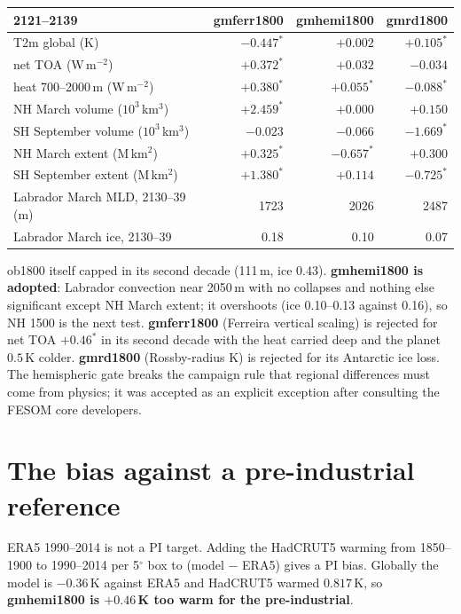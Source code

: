 \documentclass[10pt]{article}
\begin{document}
\begin{center}\small
\begin{tabular}{lrrr}
\toprule
2121--2139 & gmferr1800 & \textbf{gmhemi1800} & gmrd1800 \\
\midrule
T2m global (K)                        & $-0.447^*$ & $+0.002$ & $+0.105^*$ \\
net TOA (W\,m$^{-2}$)                 & $+0.372^*$ & $+0.032$ & $-0.034$ \\
heat 700--2000\,m (W\,m$^{-2}$)       & $+0.380^*$ & $+0.055^*$ & $-0.088^*$ \\
NH March volume ($10^3$\,km$^3$)      & $+2.459^*$ & $+0.000$ & $+0.150$ \\
SH September volume ($10^3$\,km$^3$)  & $-0.023$ & $-0.066$ & $-1.669^*$ \\
NH March extent (M\,km$^2$)           & $+0.325^*$ & $-0.657^*$ & $+0.300$ \\
SH September extent (M\,km$^2$)       & $+1.380^*$ & $+0.114$ & $-0.725^*$ \\
Labrador March MLD, 2130--39 (m)      & 1723 & 2026 & 2487 \\
Labrador March ice, 2130--39          & 0.18 & 0.10 & 0.07 \\
\bottomrule
\end{tabular}
\end{center}

ob1800 itself capped in its second decade (111\,m, ice 0.43). \textbf{gmhemi1800 is adopted}:
Labrador convection near 2050\,m with no collapses and nothing else significant except NH March
extent; it overshoots (ice 0.10--0.13 against 0.16), so NH 1500 is the next test.
\textbf{gmferr1800} (Ferreira vertical scaling) is rejected for net TOA $+0.46^*$ in its second
decade with the heat carried deep and the planet $0.5$\,K colder. \textbf{gmrd1800} (Rossby-radius
K) is rejected for its Antarctic ice loss. The hemispheric gate breaks the campaign rule that
regional differences must come from physics; it was accepted as an explicit exception after
consulting the FESOM core developers.

\section{The bias against a pre-industrial reference}\label{sec:pibias}

ERA5 1990--2014 is not a PI target. Adding the HadCRUT5 warming from 1850--1900 to 1990--2014 per
5$^\circ$ box to (model $-$ ERA5) gives a PI bias. Globally the model is $-0.36$\,K against ERA5
and HadCRUT5 warmed $0.817$\,K, so \textbf{gmhemi1800 is $+0.46$\,K too warm for the
pre-industrial}.
\end{document}
